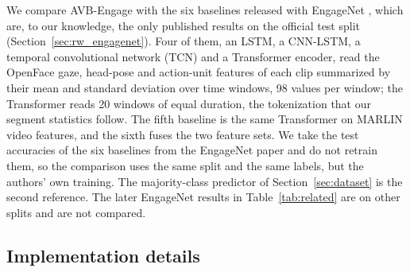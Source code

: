 \documentclass[pdflatex,iicol,sn-basic]{sn-jnl}
\newcommand{\ournet}{AVB-Engage}
\begin{document}
We compare \ournet{} with the six baselines released with EngageNet \citep{singh2023engagenet}, which are, to our knowledge, the only published results on the official test split (Section~\ref{sec:rw_engagenet}). Four of them, an LSTM, a CNN-LSTM, a temporal convolutional network (TCN) and a Transformer encoder, read the OpenFace gaze, head-pose and action-unit features of each clip summarized by their mean and standard deviation over time windows, 98 values per window; the Transformer reads 20 windows of equal duration, the tokenization that our segment statistics follow. The fifth baseline is the same Transformer on MARLIN video features, and the sixth fuses the two feature sets. We take the test accuracies of the six baselines from the EngageNet paper and do not retrain them, so the comparison uses the same split and the same labels, but the authors' own training. The majority-class predictor of Section~\ref{sec:dataset} is the second reference. The later EngageNet results in Table~\ref{tab:related} are on other splits and are not compared.

\subsection{Implementation details}\label{sec:impl}
\end{document}
